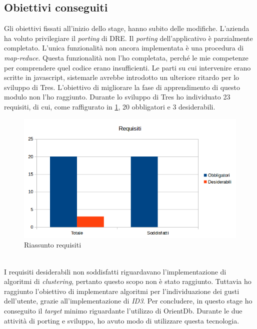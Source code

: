 \subsection{Obiettivi conseguiti}
Gli obiettivi fissati all'inizio dello stage, hanno subito delle modifiche. L'azienda ha voluto privilegiare il \emph{porting} di DRE. Il \emph{porting} dell'applicativo è parzialmente completato. L'unica funzionalità non ancora implementata è una procedura di \emph{map-reduce}. Questa funzionalità non l'ho completata, perché le mie competenze per comprendere quel codice erano insufficienti. Le parti su cui intervenire erano scritte in javascript, sistemarle avrebbe introdotto un ulteriore ritardo per lo sviluppo di Tres. L'obiettivo di migliorare la fase di apprendimento di questo modulo non l'ho raggiunto. Durante lo sviluppo di Tres ho individuato 23 requisiti, di cui, come raffigurato in \ref{fig:graficorequisiti}, 20 obbligatori e 3 desiderabili.  
\begin{figure}[h]
\centering
\includegraphics[scale=0.64]{immagini/graficorequisiti}
\caption{Riassunto requisiti}
\label{fig:graficorequisiti}
\end{figure}
\\I requisiti desiderabili non soddisfatti riguardavano l'implementazione di algoritmi di \emph{clustering}, pertanto questo scopo non è stato raggiunto.
Tuttavia ho raggiunto l'obiettivo di implementare algoritmi per l'individuazione dei gusti dell'utente, grazie all'implementazione di \emph{ID3}. Per concludere, in questo stage ho conseguito il \emph{target} minimo riguardante l'utilizzo di OrientDb. Durante le due attività di porting e sviluppo, ho avuto modo di utilizzare questa tecnologia. 
